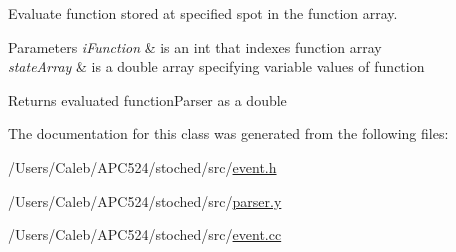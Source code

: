 Evaluate function stored at specified spot in the function array. 


\begin{DoxyParams}{Parameters}
{\em i\+Function} & is an int that indexes function array \\
\hline
{\em state\+Array} & is a double array specifying variable values of function \\
\hline
\end{DoxyParams}
\begin{DoxyReturn}{Returns}
evaluated function\+Parser as a double 
\end{DoxyReturn}


The documentation for this class was generated from the following files\+:\begin{DoxyCompactItemize}
\item 
/\+Users/\+Caleb/\+A\+P\+C524/stoched/src/\hyperlink{event_8h}{event.\+h}\item 
/\+Users/\+Caleb/\+A\+P\+C524/stoched/src/\hyperlink{parser_8y}{parser.\+y}\item 
/\+Users/\+Caleb/\+A\+P\+C524/stoched/src/\hyperlink{event_8cc}{event.\+cc}\end{DoxyCompactItemize}
